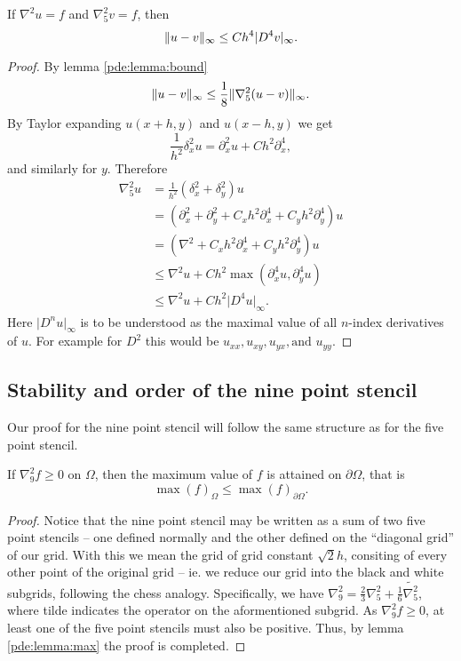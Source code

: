 \begin{theorem}
If $\nabla^2 u = f$ and $\nabla_5^2 v = f$, then
$$
\lVert u - v \rVert_\infty \leq Ch^4 \lvert D^4 v\rvert_\infty.
$$
\end{theorem}
\begin{proof}
By lemma \ref{pde:lemma:bound}
$$
\lVert u - v \rVert_\infty \leq \frac18 \lVert \nabla_5^2 (u  - v) \rVert_\infty.
$$
By Taylor expanding $u(x + h, y)$ and $u(x - h, y)$ we get
$$
\frac{1}{h^2} \delta_x^2 u = \partial_x^2 u + C h^2 \partial_x^4,
$$
and similarly for $y$.
Therefore
\begin{align*}
  \nabla_5^2 u
  &=\frac{1}{h^2} (\delta_x^2 + \delta_y^2) u\\
  &= (\partial_x^2 + \partial_y^2 + C_x h^2 \partial_x^4 + C_y h^2 \partial_y^4) u\\
  &= (\nabla^2 + C_x h^2 \partial_x^4 + C_y h^2 \partial_y^4) u\\
  &\leq \nabla^2 u + C h^2 \max(\partial_x^4 u, \partial_y^4 u)\\
  &\leq \nabla^2 u + C h^2 \lvert D^4 u \rvert_\infty.
\end{align*}
Here $\lvert D^n u\rvert_\infty$ is to be understood as the maximal value of all $n$-index derivatives of $u$.
For example for $D^2$ this would be $u_{xx}, u_{xy}, u_{yx}, \text{and } u_{yy}$.
\end{proof}


\subsection{Stability and order of the nine point stencil}
Our proof for the nine point stencil will follow the same structure as for the five point stencil.

\begin{lemma}\label{pde:lemma:max9}
If $\nabla_9^2 f \geq 0$ on $\Omega$, then the maximum value of $f$ is attained on $\partial \Omega$, that is
$$
\max(f)_\Omega \leq \max(f)_{\partial \Omega}.
$$
\end{lemma}
\begin{proof}
Notice that the nine point stencil may be written as a sum of two five point stencils --
one defined normally and the other defined on the ``diagonal grid'' of our grid.
With this we mean the grid of grid constant $\sqrt{2}h$, consiting of every other point of the original grid -- ie. we reduce our grid into the black and white subgrids, following the chess analogy.
Specifically, we have $\nabla_9^2 = \frac23 \nabla_5^2 + \frac16 \tilde{\nabla_5^2}$, where tilde indicates the operator on the aformentioned subgrid.
As $\nabla_9^2 f \geq 0$, at least one of the five point stencils must also be positive.
Thus, by lemma \ref{pde:lemma:max} the proof is completed.
\end{proof}

